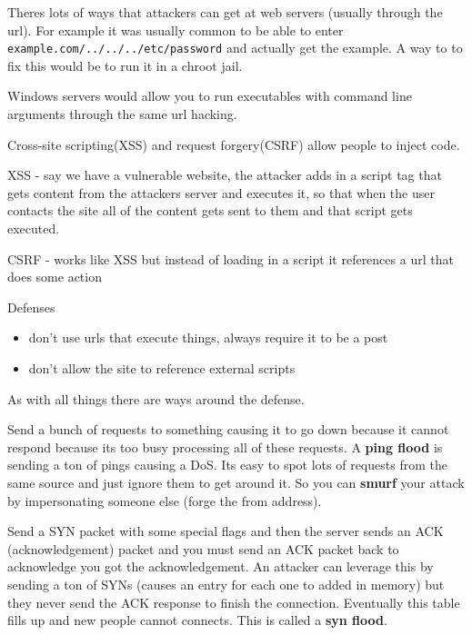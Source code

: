 \documentclass{article}
\begin{document}



Theres lots of ways that attackers can get at web servers (usually through the url). For example it was usually common to be able to enter \texttt{example.com/../../../etc/password} and actually get the example. A way to to fix this would be to run it in a chroot jail.

Windows servers would allow you to run executables with command line arguments through the same url hacking. 


Cross-site scripting(XSS) and request forgery(CSRF) allow people to inject code.

XSS - say we have a vulnerable website, the attacker adds in a script tag that gets content from the attackers server and executes it, so that when the user contacts the site all of the content gets sent to them and that script gets executed.

CSRF - works like XSS but instead of loading in a script it references a url that does some action

Defenses
\begin{itemize}
	\item don't use urls that execute things, always require it to be a post
	\item don't allow the site to reference external scripts
\end{itemize}
As with all things there are ways around the defense.


Send a bunch of requests to something causing it to go down because it cannot respond because its too busy processing all of these requests. A \textbf{ping flood} is sending a ton of pings causing a DoS. Its easy to spot lots of requests from the same source and just ignore them to get around it. So you can \textbf{smurf} your attack by impersonating someone else (forge the from address). 


Send a SYN packet with some special flags and then the server sends an ACK (acknowledgement) packet and you must send an ACK packet back to acknowledge you got the acknowledgement. An attacker can leverage this by sending a ton of SYNs (causes an entry for each one to added in memory) but they never send the ACK response to finish the connection. Eventually this table fills up and new people cannot connects. This is called a \textbf{syn flood}.
\end{document}
